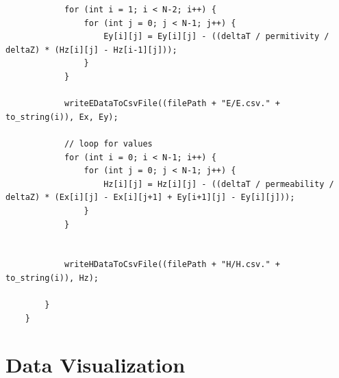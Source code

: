 \begin{verbatim}
			for (int i = 1; i < N-2; i++) {
				for (int j = 0; j < N-1; j++) {
					Ey[i][j] = Ey[i][j] - ((deltaT / permitivity / deltaZ) * (Hz[i][j] - Hz[i-1][j]));
				}
			}
			
			writeEDataToCsvFile((filePath + "E/E.csv." + to_string(i)), Ex, Ey);
			
			// loop for values
			for (int i = 0; i < N-1; i++) {
				for (int j = 0; j < N-1; j++) {
					Hz[i][j] = Hz[i][j] - ((deltaT / permeability / deltaZ) * (Ex[i][j] - Ex[i][j+1] + Ey[i+1][j] - Ey[i][j]));
				}
			}
			
			
			writeHDataToCsvFile((filePath + "H/H.csv." + to_string(i)), Hz);
			
		}
	}
\end{verbatim}


\section{Data Visualization}

